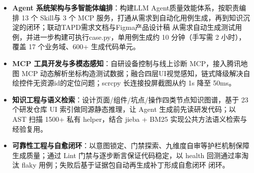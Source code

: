 \documentclass[10pt]{article}
\begin{document}
    \begin{itemize}
        \item \textbf{Agent 系统架构与多智能体编排}：构建LLM Agent质量效能体系，按职责编排 13 个 Skill与 3 个 MCP 服务，打通从需求到自动化用例生成，再到知识沉淀的闭环；联动TAPD需求文档与Figma产品设计稿 从需求自动生成测试用例，并进一步构建可执行case.py，单用例生成约 10 分钟（手写需 2 小时），覆盖 17 个业务域、600+ 生成代码单元。
        \item \textbf{MCP 工具开发与多模态感知}：自研设备控制与线上诊断 MCP，接入腾讯地图 MCP 动态解析坐标构造测试数据；融合四层UI视觉感知，链式降级解决自绘控件无资源id的定位问题；scrcpy 长连接投屏截图从约 1s 降至 50ms。
        \item \textbf{知识工程与语义检索}：设计页面/组件/坑点/操作四类节点知识图谱，基于 23 个研发仓库 UI 索引做同源静态推理，让 Agent 生成前先读研发代码；以 AST 扫描 1500+ 私有 helper，结合 jieba + BM25 实现公共方法语义检索与经验复用。
        \item \textbf{可靠性工程与自愈闭环}：以意图锁定、门禁探索、九维度自审等护栏机制保障生成质量；通过 Lint 门禁与逐步断言保证代码稳定，以 health 回测通过率淘汰 flaky 用例；失败后基于证据包自动再生成补丁形成自愈闭环 闭环。
    \end{itemize}
\end{document}
